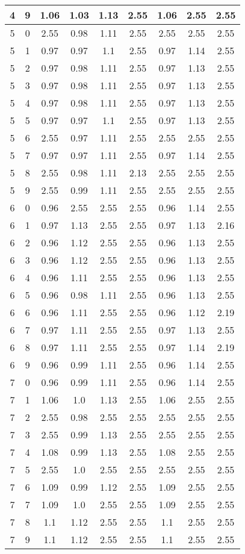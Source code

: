 \begin{longtable}{|c|c||c||c|c|c||c|c|c|}
	4 & 9 & 1.06 & 1.03 & 1.13 & 2.55 & 1.06 & 2.55 & 2.55 \\ \hline
	5 & 0 & 2.55 & 0.98 & 1.11 & 2.55 & 2.55 & 2.55 & 2.55 \\ \hline
	5 & 1 & 0.97 & 0.97 & 1.1 & 2.55 & 0.97 & 1.14 & 2.55 \\ \hline
	5 & 2 & 0.97 & 0.98 & 1.11 & 2.55 & 0.97 & 1.13 & 2.55 \\ \hline
	5 & 3 & 0.97 & 0.98 & 1.11 & 2.55 & 0.97 & 1.13 & 2.55 \\ \hline
	5 & 4 & 0.97 & 0.98 & 1.11 & 2.55 & 0.97 & 1.13 & 2.55 \\ \hline
	5 & 5 & 0.97 & 0.97 & 1.1 & 2.55 & 0.97 & 1.13 & 2.55 \\ \hline
	5 & 6 & 2.55 & 0.97 & 1.11 & 2.55 & 2.55 & 2.55 & 2.55 \\ \hline
	5 & 7 & 0.97 & 0.97 & 1.11 & 2.55 & 0.97 & 1.14 & 2.55 \\ \hline
	5 & 8 & 2.55 & 0.98 & 1.11 & 2.13 & 2.55 & 2.55 & 2.55 \\ \hline
	5 & 9 & 2.55 & 0.99 & 1.11 & 2.55 & 2.55 & 2.55 & 2.55 \\ \hline
	6 & 0 & 0.96 & 2.55 & 2.55 & 2.55 & 0.96 & 1.14 & 2.55 \\ \hline
	6 & 1 & 0.97 & 1.13 & 2.55 & 2.55 & 0.97 & 1.13 & 2.16 \\ \hline
	6 & 2 & 0.96 & 1.12 & 2.55 & 2.55 & 0.96 & 1.13 & 2.55 \\ \hline
	6 & 3 & 0.96 & 1.12 & 2.55 & 2.55 & 0.96 & 1.13 & 2.55 \\ \hline
	6 & 4 & 0.96 & 1.11 & 2.55 & 2.55 & 0.96 & 1.13 & 2.55 \\ \hline
	6 & 5 & 0.96 & 0.98 & 1.11 & 2.55 & 0.96 & 1.13 & 2.55 \\ \hline
	6 & 6 & 0.96 & 1.11 & 2.55 & 2.55 & 0.96 & 1.12 & 2.19 \\ \hline
	6 & 7 & 0.97 & 1.11 & 2.55 & 2.55 & 0.97 & 1.13 & 2.55 \\ \hline
	6 & 8 & 0.97 & 1.11 & 2.55 & 2.55 & 0.97 & 1.14 & 2.19 \\ \hline
	6 & 9 & 0.96 & 0.99 & 1.11 & 2.55 & 0.96 & 1.14 & 2.55 \\ \hline
	7 & 0 & 0.96 & 0.99 & 1.11 & 2.55 & 0.96 & 1.14 & 2.55 \\ \hline
	7 & 1 & 1.06 & 1.0 & 1.13 & 2.55 & 1.06 & 2.55 & 2.55 \\ \hline
	7 & 2 & 2.55 & 0.98 & 2.55 & 2.55 & 2.55 & 2.55 & 2.55 \\ \hline
	7 & 3 & 2.55 & 0.99 & 1.13 & 2.55 & 2.55 & 2.55 & 2.55 \\ \hline
	7 & 4 & 1.08 & 0.99 & 1.13 & 2.55 & 1.08 & 2.55 & 2.55 \\ \hline
	7 & 5 & 2.55 & 1.0 & 2.55 & 2.55 & 2.55 & 2.55 & 2.55 \\ \hline
	7 & 6 & 1.09 & 0.99 & 1.12 & 2.55 & 1.09 & 2.55 & 2.55 \\ \hline
	7 & 7 & 1.09 & 1.0 & 2.55 & 2.55 & 1.09 & 2.55 & 2.55 \\ \hline
	7 & 8 & 1.1 & 1.12 & 2.55 & 2.55 & 1.1 & 2.55 & 2.55 \\ \hline
	7 & 9 & 1.1 & 1.12 & 2.55 & 2.55 & 1.1 & 2.55 & 2.55 \\ \hline
\end{longtable}
